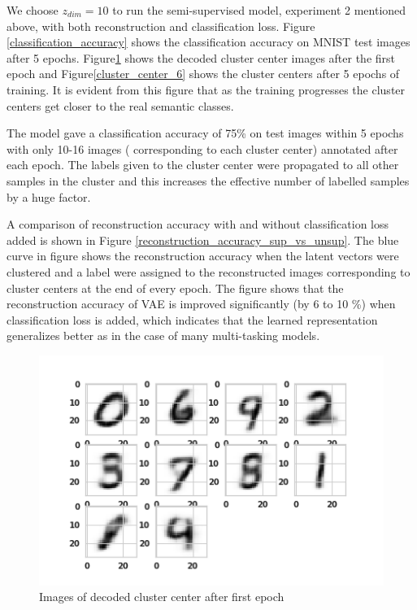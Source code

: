 \documentclass{uai2021} %
\begin{document}
We choose $z_{dim}=10$ to run the  semi-supervised model, experiment 2 mentioned above,  with both reconstruction and classification loss.
Figure \ref{classification_accuracy} shows the classification accuracy on MNIST test images after 5 epochs.
Figure\ref{cluster_center_1} shows the decoded cluster center images after the first epoch and Figure\ref{cluster_center_6} shows the cluster centers after 5 epochs of training.
It is evident from this figure that as the training progresses the cluster centers get closer to the real semantic classes.


The model gave a classification accuracy of 75\% on test images within 5 epochs with only 10-16 images ( corresponding to each  cluster center) annotated after each epoch.
The labels given to the cluster center were propagated to all other samples in the cluster and this increases the effective number of labelled samples by a huge factor.

A comparison of reconstruction accuracy with and without classification loss added is shown in Figure \ref{reconstruction_accuracy_sup_vs_unsup}.
The blue curve in figure shows the reconstruction accuracy when the latent vectors were clustered and a label were assigned to the reconstructed images corresponding to  cluster centers at the end of every epoch.
The figure shows that the reconstruction accuracy of VAE is improved significantly  (by 6 to 10 \%) when classification loss is added, which indicates that the learned representation generalizes better as in the case of many multi-tasking models.


\begin{figure}[]
\centering
\includegraphics[width=\linewidth]{cluster_centers_epoch_1.0}
\caption{Images of decoded cluster center after first epoch}
\label{cluster_center_1}
\end{figure}
\end{document}
